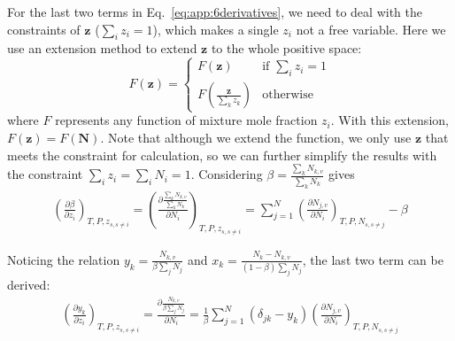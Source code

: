 For the last two terms in Eq.~\ref{eq:app:6derivatives}, we need to deal with the constraints of $\mathbf{z}$ ($\sum_i z_i =1$), which makes a single $z_i$ not a free variable. Here we use an extension method to extend $\mathbf{z}$ to the whole positive space:
\begin{equation} 
F(\mathbf{z}) = 
\begin{cases}
 F\left(\mathbf{z}\right)  &\text{if }  \sum_i z_i =1 \\
 F\left(\frac{\mathbf{z}}{\sum_k z_k}\right) & \text{otherwise} 
\end{cases}  
\end{equation}
where $F$ represents any function of mixture mole fraction $z_i$.  With this extension, $F(\mathbf{z}) = F(\mathbf{N})$.  Note that although we extend the function, we only use $\mathbf{z}$ that meets the constraint for calculation, so we can further simplify the results with the constraint $\sum_i z_i =\sum_i N_i = 1$.
Considering $\beta  = \frac{\sum_k N_{k,v}}{\sum_k N_k}$ gives 
\begin{align}
\left(\frac{\partial \beta}{\partial z_i}\right)_{T,P,z_{s,s\neq i}}=\left(\frac{\partial \frac{\sum_k N_{k,v}}{\sum_k N_{k}}}{\partial N_i}\right)_{T,P,z_{s,s\neq i}}=\sum_{j=1}^N\left(\frac{\partial N_{j,v}}{\partial N_i}\right)_{T,P,N_{s,s\neq j}} -\beta \label{eq:dbetadz}
\end{align}

Noticing the relation $y_k=\frac{N_{k,v}} { \beta \sum_j N_j}$ and $x_k=\frac{N_k-N_{k,v}} { (1-\beta) \sum_j N_j}$, the last two term can be derived:
\begin{align}\left(\frac{\partial y_k}{\partial z_i}\right)_{T,P,z_{s,s\neq i}}= \frac{\partial \frac{N_{k,v}} { \beta \sum_j N_j}}{\partial N_i}=\frac{1}{\beta} \sum_{j=1}^N\left(\delta _{jk}-y_k\right)\left(\frac{\partial N_{j,v}}{\partial N_i}\right)_{T,P,N_{s,s\neq j}}
\end{align}

